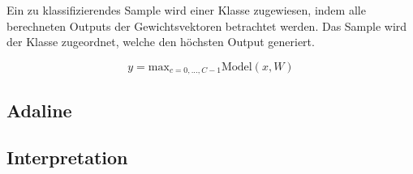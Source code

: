 Ein zu klassifizierendes Sample wird einer Klasse zugewiesen, indem alle berechneten Outputs der Gewichtsvektoren betrachtet werden. Das Sample wird der Klasse zugeordnet, welche den höchsten Output generiert.

$$ y = \text{max}_{c=0,...,C-1} \text{Model}(x, W)$$


\newpage
\subsection{Adaline}
\begin{flushleft}
\end{flushleft}

\subsection{Interpretation}
\begin{flushleft}
\end{flushleft}




